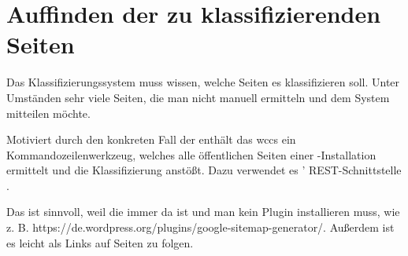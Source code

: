 \section{Auffinden der zu klassifizierenden Seiten}
    Das Klassifizierungssystem muss wissen, welche Seiten es klassifizieren soll.
    Unter Umständen sehr viele Seiten, die man nicht manuell ermitteln und dem System
    mitteilen möchte.

    Motiviert durch den konkreten Fall der {\fernUni} enthält das \gls{wccs}
    ein Kommandozeilenwerkzeug, welches alle öffentlichen Seiten einer
    {\wordpress}-Installation ermittelt und die Klassifizierung anstößt.
    Dazu verwendet es {\wordpress}' REST-Schnittstelle \cite{wordpress:RestAPI}.

    Das ist sinnvoll, weil die immer da ist und man kein Plugin installieren muss,
    wie z. B. https://de.wordpress.org/plugins/google-sitemap-generator/.
    Außerdem ist es leicht als Links auf Seiten zu folgen.

